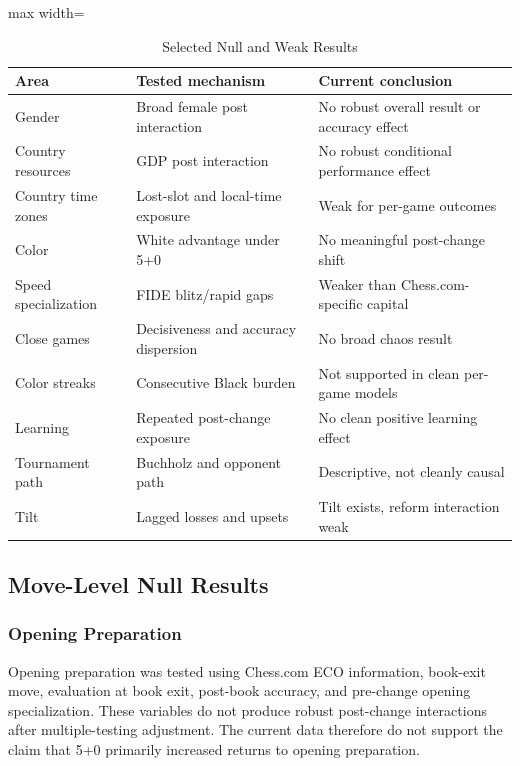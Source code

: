 \begin{table}[H]
\centering
\caption{Selected Null and Weak Results}
\label{tab:null-results}
\begin{adjustbox}{max width=\textwidth}
\begin{tabular}{lll}
\toprule
Area & Tested mechanism & Current conclusion \\
\midrule
Gender & Broad female post interaction & No robust overall result or accuracy effect \\
Country resources & GDP post interaction & No robust conditional performance effect \\
Country time zones & Lost-slot and local-time exposure & Weak for per-game outcomes \\
Color & White advantage under 5+0 & No meaningful post-change shift \\
Speed specialization & FIDE blitz/rapid gaps & Weaker than Chess.com-specific capital \\
Close games & Decisiveness and accuracy dispersion & No broad chaos result \\
Color streaks & Consecutive Black burden & Not supported in clean per-game models \\
Learning & Repeated post-change exposure & No clean positive learning effect \\
Tournament path & Buchholz and opponent path & Descriptive, not cleanly causal \\
Tilt & Lagged losses and upsets & Tilt exists, reform interaction weak \\
\bottomrule
\end{tabular}
\end{adjustbox}
\end{table}

\subsection{Move-Level Null Results}

\subsubsection{Opening Preparation}

Opening preparation was tested using Chess.com ECO information, book-exit move, evaluation at book exit, post-book accuracy, and pre-change opening specialization. These variables do not produce robust post-change interactions after multiple-testing adjustment. The current data therefore do not support the claim that 5+0 primarily increased returns to opening preparation.

